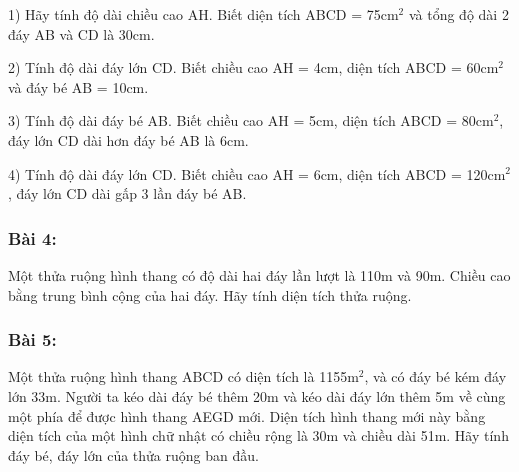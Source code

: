 \documentclass[11pt]{article}
\begin{document}
1) Hãy tính độ dài chiều cao AH. Biết diện tích ABCD = 75cm$^2$ và tổng độ dài 2 đáy AB và CD là 30cm.

2) Tính độ dài đáy lớn CD. Biết chiều cao AH = 4cm, diện tích ABCD = 60cm$^2$ và đáy bé AB = 10cm.

3) Tính độ dài đáy bé AB. Biết chiều cao AH = 5cm, diện tích ABCD = 80cm$^2$, đáy lớn CD dài hơn đáy bé AB là 6cm.

4) Tính độ dài đáy lớn CD. Biết chiều cao AH = 6cm, diện tích ABCD = 120cm$^2$, đáy lớn CD dài gấp 3 lần đáy bé AB.

\subsubsection*{Bài 4:} Một thửa ruộng hình thang có độ dài hai đáy lần lượt là 110m và 90m. Chiều cao bằng trung bình cộng của hai đáy. Hãy tính diện tích thửa ruộng.

\subsubsection*{Bài 5:} Một thửa ruộng hình thang ABCD có diện tích là 1155m$^2$, và có đáy bé kém đáy lớn 33m. Người ta kéo dài đáy bé thêm 20m và kéo dài đáy lớn thêm 5m về cùng một phía để được hình thang AEGD mới. Diện tích hình thang mới này bằng diện tích của một hình chữ nhật có chiều rộng là 30m và chiều dài 51m. Hãy tính đáy bé, đáy lớn của thửa ruộng ban đầu.

\begin{center}
\end{center}
\end{document}
